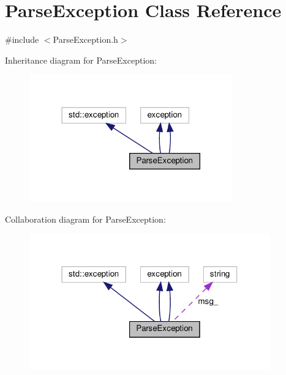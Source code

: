 \hypertarget{classParseException}{}\section{Parse\+Exception Class Reference}
\label{classParseException}


{\ttfamily \#include $<$Parse\+Exception.\+h$>$}



Inheritance diagram for Parse\+Exception\+:
\nopagebreak
\begin{figure}[H]
\begin{center}
\leavevmode
\includegraphics[width=249pt]{classParseException__inherit__graph}
\end{center}
\end{figure}


Collaboration diagram for Parse\+Exception\+:
\nopagebreak
\begin{figure}[H]
\begin{center}
\leavevmode
\includegraphics[width=295pt]{classParseException__coll__graph}
\end{center}
\end{figure}
